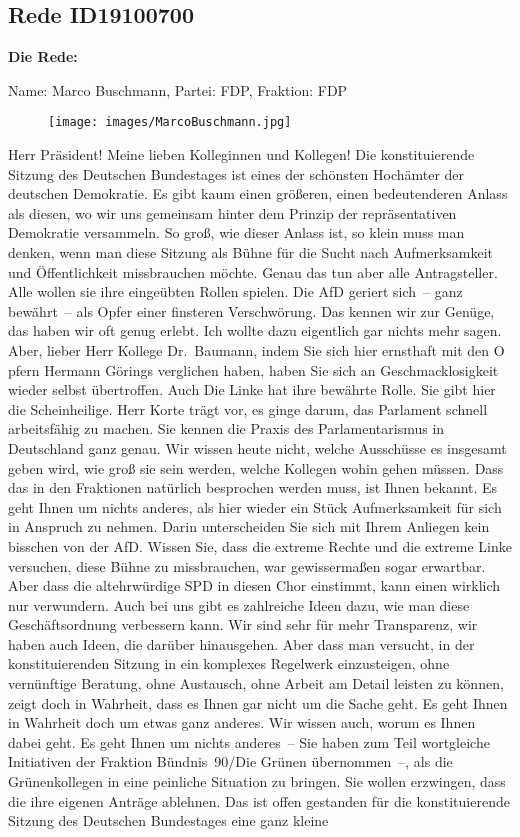 \documentclass[10pt, a4paper]{report}
\begin{document}
\subsection{Rede ID19100700}

\textbf{Die Rede:}

Name: Marco Buschmann, Partei: FDP, Fraktion: FDP

\begin{figure}[!ht]
\texttt{[image: images/MarcoBuschmann.jpg]}
\end{figure}


Herr Präsident! Meine lieben Kolleginnen und Kollegen! Die konstituierende Sitzung des Deutschen Bundestages ist eines der schönsten Hochämter der deutschen Demokratie. Es gibt kaum einen größeren, einen bedeutenderen Anlass als diesen, wo wir uns gemeinsam hinter dem Prinzip der repräsentativen Demokratie versammeln. So groß, wie dieser Anlass ist, so klein muss man denken, wenn man diese Sitzung als Bühne für die Sucht nach Aufmerksamkeit und Öffentlichkeit missbrauchen möchte. Genau das tun aber alle Antragsteller. Alle wollen sie ihre eingeübten Rollen spielen. Die AfD geriert sich – ganz bewährt – als Opfer einer finsteren Verschwörung. Das kennen wir zur Genüge, das haben wir oft genug erlebt. Ich wollte dazu eigentlich gar nichts mehr sagen. Aber, lieber Herr Kollege Dr. Baumann, indem Sie sich hier ernsthaft mit den O pfern Hermann Görings verglichen haben, haben Sie sich an Geschmacklosigkeit wieder selbst übertroffen. Auch Die Linke hat ihre bewährte Rolle. Sie gibt hier die Scheinheilige. Herr Korte trägt vor, es ginge darum, das Parlament schnell arbeitsfähig zu machen. Sie kennen die Praxis des Parlamentarismus in Deutschland ganz genau. Wir wissen heute nicht, welche Ausschüsse es insgesamt geben wird, wie groß sie sein werden, welche Kollegen wohin gehen müssen. Dass das in den Fraktionen natürlich besprochen werden muss, ist Ihnen bekannt. Es geht Ihnen um nichts anderes, als hier wieder ein Stück Aufmerksamkeit für sich in Anspruch zu nehmen. Darin unterscheiden Sie sich mit Ihrem Anliegen kein bisschen von der AfD. Wissen Sie, dass die extreme Rechte und die extreme Linke versuchen, diese Bühne zu missbrauchen, war gewissermaßen sogar erwartbar. Aber dass die altehrwürdige SPD in diesen Chor einstimmt, kann einen wirklich nur verwundern. Auch bei uns gibt es zahlreiche Ideen dazu, wie man diese Geschäftsordnung verbessern kann. Wir sind sehr für mehr Transparenz, wir haben auch Ideen, die darüber hinausgehen. Aber dass man versucht, in der konstituierenden Sitzung in ein komplexes Regelwerk einzusteigen, ohne vernünftige Beratung, ohne Austausch, ohne Arbeit am Detail leisten zu können, zeigt doch in Wahrheit, dass es Ihnen gar nicht um die Sache geht. Es geht Ihnen in Wahrheit doch um etwas ganz anderes. Wir wissen auch, worum es Ihnen dabei geht. Es geht Ihnen um nichts anderes – Sie haben zum Teil wortgleiche Initiativen der Fraktion Bündnis 90/Die Grünen übernommen –, als die Grünenkollegen in eine peinliche Situation zu bringen. Sie wollen erzwingen, dass die ihre eigenen Anträge ablehnen. Das ist offen gestanden für die konstituierende Sitzung des Deutschen Bundestages eine ganz kleine 
\end{document}
